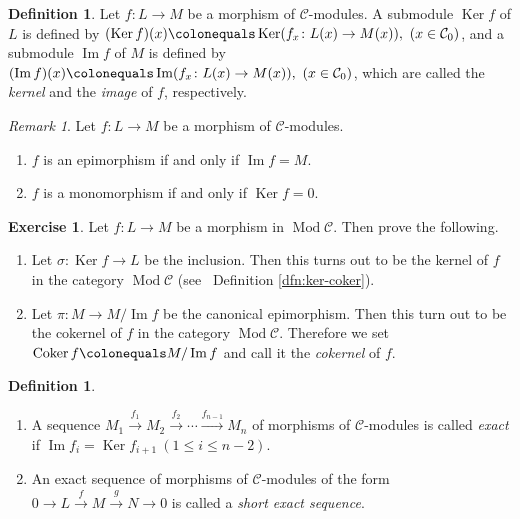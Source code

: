 \documentclass{surv-l}
\numberwithin{equation}{chapter}
\numberwithin{figure}{chapter}
\theoremstyle{plain}
\theoremstyle{definition}
\newtheorem{dfn}[thm]{Definition}
\newtheorem{exc}[thm]{Exercise}
\theoremstyle{remark}
\newtheorem{rmk}[thm]{Remark}
\DeclareMathOperator{\Ker}{Ker}
\DeclareMathOperator{\Cok}{Coker}
\DeclareMathOperator{\Mod}{Mod}
\begin{document}
\begin{dfn}\label{dfn:Im-Ker}
Let $f \colon L \to M$ be a morphism of ${\mathcal{C}}$-modules.
A submodule $\Ker f$ of $L$ is defined by
$(\Ker f)(x)\colonequals  \Ker (f_x \colon L(x) \to M(x)), \ (x \in {\mathcal{C}}_0)$, and
a submodule $\operatorname{Im} f$ of $M$ is defined by
$(\operatorname{Im} f)(x)\colonequals  \operatorname{Im} (f_x \colon L(x) \to M(x)), \ (x \in {\mathcal{C}}_0)$,
which are called the \emph{kernel} and the \emph{image} of $f$, respectively.
\end{dfn}

\begin{rmk}
Let $f \colon L \to M$ be a morphism of ${\mathcal{C}}$-modules.
\begin{enumerate}
\item
$f$ is an epimorphism if and only if $\operatorname{Im} f = M$.
\item
$f$ is a monomorphism if and only if $\Ker f = 0$.
\end{enumerate}
\end{rmk}

\begin{exc}
Let $f \colon L \to M$ be a morphism in $\Mod {\mathcal{C}}$.
Then prove the following.
\begin{enumerate}
\item
Let $\sigma \colon \Ker f \to L$ be the inclusion.
Then this turns out to be the kernel of $f$ in the category
$\Mod {\mathcal{C}}$ (see \ Definition \ref{dfn:ker-coker}).
\item
Let $\pi \colon M \to M/\operatorname{Im} f$ be the canonical epimorphism.
Then this turn out to be the cokernel of $f$ in the category
$\Mod {\mathcal{C}}$.
Therefore we set $\Cok f\colonequals  M/\operatorname{Im} f$ and call it the
\emph{cokernel} of $f$.
\end{enumerate}
\end{exc}

\begin{dfn}\leavevmode
\label{dfn:ex-seq-fun}
\begin{enumerate}
\item
A sequence $M_1 \xrightarrow{f_1} M_2 \xrightarrow{f_2} \cdots \xrightarrow{f_{n-1}} M_n$ of
morphisms of \({\mathcal{C}}\)-modules is called \emph{exact}
if $\operatorname{Im} f_i = \Ker f_{i+1}\ (1 \le i \le n-2)$.
\item
An exact sequence of morphisms
of \({\mathcal{C}}\)-modules of the form
$0 \to L \xrightarrow{f} M \xrightarrow{g} N \to 0$ is called a \emph{short exact sequence}.
\end{enumerate}
\end{dfn}
\end{document}
